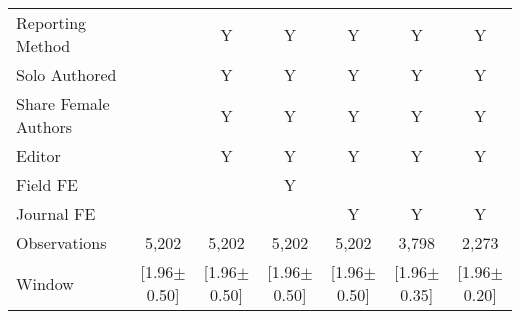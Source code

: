 \begin{tabular}{l*{6}{c}}
Reporting Method &         &        Y&        Y&        Y&        Y&        Y\\
Solo Authored   &         &        Y&        Y&        Y&        Y&        Y\\
Share Female Authors &         &        Y&        Y&        Y&        Y&        Y\\
Editor          &         &        Y&        Y&        Y&        Y&        Y\\
Field FE        &         &         &        Y&         &         &         \\
Journal FE      &         &         &         &        Y&        Y&        Y\\
\hline
Observations    &    5,202&    5,202&    5,202&    5,202&    3,798&    2,273\\
Window          &[1.96$\pm$0.50]&[1.96$\pm$0.50]&[1.96$\pm$0.50]&[1.96$\pm$0.50]&[1.96$\pm$0.35]&[1.96$\pm$0.20]\\
\hline\hline
\end{tabular}
